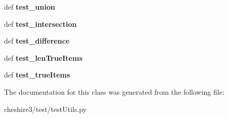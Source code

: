 \begin{DoxyCompactItemize}
\item 
\hypertarget{classcheshire3_1_1test_1_1test_utils_1_1_simple_bitfield_test_case_a645de715b27450613dae35b96db6ed9a}{def {\bfseries test\-\_\-union}}\label{classcheshire3_1_1test_1_1test_utils_1_1_simple_bitfield_test_case_a645de715b27450613dae35b96db6ed9a}

\item 
\hypertarget{classcheshire3_1_1test_1_1test_utils_1_1_simple_bitfield_test_case_a1ac93aa22da26971d6f04bf89bfda458}{def {\bfseries test\-\_\-intersection}}\label{classcheshire3_1_1test_1_1test_utils_1_1_simple_bitfield_test_case_a1ac93aa22da26971d6f04bf89bfda458}

\item 
\hypertarget{classcheshire3_1_1test_1_1test_utils_1_1_simple_bitfield_test_case_a2930bf1851363bf88266590d47818898}{def {\bfseries test\-\_\-difference}}\label{classcheshire3_1_1test_1_1test_utils_1_1_simple_bitfield_test_case_a2930bf1851363bf88266590d47818898}

\item 
\hypertarget{classcheshire3_1_1test_1_1test_utils_1_1_simple_bitfield_test_case_adbf5131ed1e094763124599364364b06}{def {\bfseries test\-\_\-len\-True\-Items}}\label{classcheshire3_1_1test_1_1test_utils_1_1_simple_bitfield_test_case_adbf5131ed1e094763124599364364b06}

\item 
\hypertarget{classcheshire3_1_1test_1_1test_utils_1_1_simple_bitfield_test_case_a05fa65b37a268febce1c4d7cf9356f1b}{def {\bfseries test\-\_\-true\-Items}}\label{classcheshire3_1_1test_1_1test_utils_1_1_simple_bitfield_test_case_a05fa65b37a268febce1c4d7cf9356f1b}

\end{DoxyCompactItemize}


The documentation for this class was generated from the following file\-:\begin{DoxyCompactItemize}
\item 
cheshire3/test/test\-Utils.\-py\end{DoxyCompactItemize}
